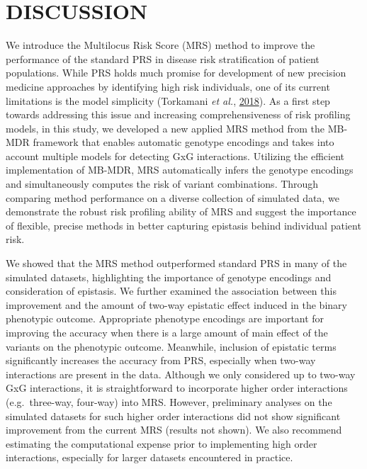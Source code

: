 \documentclass[a4paper,twoside, 9pt]{article}
\begin{document}
\section{\uppercase{Discussion}}\label{discussion}

\noindent We introduce the Multilocus Risk Score (MRS) method to improve the
performance of the standard PRS in disease risk stratification of
patient populations. While PRS holds much promise for development of new
precision medicine approaches by identifying high risk individuals, one of its current
limitations is the model simplicity (Torkamani \emph{et al.},
\protect\hyperlink{ref-1GK3F1BxE}{2018}). As a first step towards
addressing this issue and increasing comprehensiveness of risk profiling
models, in this study, we developed a new applied MRS method from the
MB-MDR framework that enables automatic genotype encodings and takes
into account multiple models for detecting GxG interactions. Utilizing
the efficient implementation of MB-MDR, MRS automatically infers the
genotype encodings and simultaneously computes the risk of variant
combinations. Through comparing method performance on a diverse
collection of simulated data, we demonstrate the robust risk
profiling ability of MRS and suggest the importance of flexible, precise
methods in better capturing epistasis behind individual patient risk.

We showed that the MRS method outperformed standard PRS in many of the
simulated datasets, highlighting the importance of genotype encodings
and consideration of epistasis. We further examined the association
between this improvement and the amount of two-way epistatic effect
induced in the binary phenotypic outcome. Appropriate phenotype
encodings are important for improving the accuracy when there is a large
amount of main effect of the variants on the phenotypic outcome.
Meanwhile, inclusion of epistatic terms significantly increases the
accuracy from PRS, especially when two-way interactions are present in
the data. Although we only considered up to two-way GxG interactions, it
is straightforward to incorporate higher order interactions
(e.g.~three-way, four-way) into MRS. However, preliminary analyses on
the simulated datasets for such higher order interactions did not show
significant improvement from the current MRS (results not shown). We
also recommend estimating the computational expense prior to
implementing high order interactions, especially for larger datasets
encountered in practice.
\end{document}
